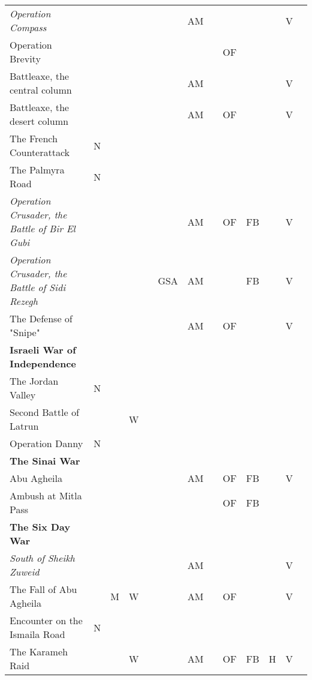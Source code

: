 \documentclass[a4paper]{article}
\newenvironment{texte}{\rmfamily\footnotesize}{}
\begin{document}
\begin{texte}
\begin{tabular}{lrrrrrrrrrrrr}
\it  Operation Compass                             &   &    &    &    &     & AM &   &    &    &   &  V &   \\
     Operation Brevity                             &   &    &    &    &     &    &   & OF &    &   &    &   \\
     Battleaxe, the central column                 &   &    &    &    &     & AM &   &    &    &   &  V &   \\
     Battleaxe, the desert column                  &   &    &    &    &     & AM &   & OF &    &   &  V &   \\
     The French Counterattack                      & N &    &    &    &     &    &   &    &    &   &    &   \\
     The Palmyra Road                              & N &    &    &    &     &    &   &    &    &   &    &   \\
\it  Operation Crusader, the Battle of Bir El Gubi &   &    &    &    &     & AM &   & OF & FB &   &  V &   \\
\it  Operation Crusader, the Battle of Sidi Rezegh &   &    &    &    & GSA & AM &   &    & FB &   &  V &   \\
     The Defense of "Snipe"                        &   &    &    &    &     & AM &   & OF &    &   &  V &   \\

\bf Israeli War of Independence \\

     The Jordan Valley                             & N &    &    &    &     &    &   &    &    &   &    &   \\
     Second Battle of Latrun                       &   &    &  W &    &     &    &   &    &    &   &    &   \\
     Operation Danny                               & N &    &    &    &     &    &   &    &    &   &    &   \\

\bf The Sinai War \\

     Abu Agheila                                   &   &    &    &    &     & AM &   & OF & FB &   &  V &   \\
     Ambush at Mitla Pass                          &   &    &    &    &     &    &   & OF & FB &   &    &   \\

\bf The Six Day War \\

\it  South of Sheikh Zuweid                        &   &    &    &    &     & AM &   &    &    &   &  V &   \\
     The Fall of Abu Agheila                       &   &  M &  W &    &     & AM &   & OF &    &   &  V &   \\
     Encounter on the Ismaila Road                 & N &    &    &    &     &    &   &    &    &   &    &   \\
     The Karameh Raid                              &   &    &  W &    &     & AM &   & OF & FB & H &  V &   \\


\end{tabular}
\end{texte}
\end{document}
